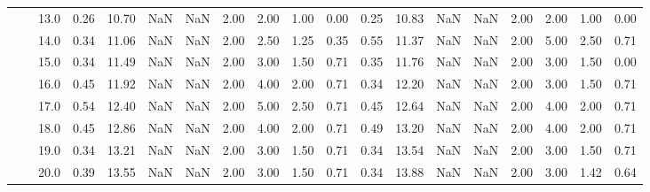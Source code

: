\begin{tabular}{lllrrrrrrrrrrrrrrrr}
       &     & 13.0 &      0.26 &      10.70 &               NaN &                NaN & 2.00 &   2.00 &             1.00 &                         0.00 &      0.25 &      10.83 &               NaN &                NaN & 2.00 &   2.00 &             1.00 &                         0.00 \\
       &     & 14.0 &      0.34 &      11.06 &               NaN &                NaN & 2.00 &   2.50 &             1.25 &                         0.35 &      0.55 &      11.37 &               NaN &                NaN & 2.00 &   5.00 &             2.50 &                         0.71 \\
       &     & 15.0 &      0.34 &      11.49 &               NaN &                NaN & 2.00 &   3.00 &             1.50 &                         0.71 &      0.35 &      11.76 &               NaN &                NaN & 2.00 &   3.00 &             1.50 &                         0.00 \\
       &     & 16.0 &      0.45 &      11.92 &               NaN &                NaN & 2.00 &   4.00 &             2.00 &                         0.71 &      0.34 &      12.20 &               NaN &                NaN & 2.00 &   3.00 &             1.50 &                         0.71 \\
       &     & 17.0 &      0.54 &      12.40 &               NaN &                NaN & 2.00 &   5.00 &             2.50 &                         0.71 &      0.45 &      12.64 &               NaN &                NaN & 2.00 &   4.00 &             2.00 &                         0.71 \\
       &     & 18.0 &      0.45 &      12.86 &               NaN &                NaN & 2.00 &   4.00 &             2.00 &                         0.71 &      0.49 &      13.20 &               NaN &                NaN & 2.00 &   4.00 &             2.00 &                         0.71 \\
       &     & 19.0 &      0.34 &      13.21 &               NaN &                NaN & 2.00 &   3.00 &             1.50 &                         0.71 &      0.34 &      13.54 &               NaN &                NaN & 2.00 &   3.00 &             1.50 &                         0.71 \\
       &     & 20.0 &      0.39 &      13.55 &               NaN &                NaN & 2.00 &   3.00 &             1.50 &                         0.71 &      0.34 &      13.88 &               NaN &                NaN & 2.00 &   3.00 &             1.42 &                         0.64 \\

\end{tabular}
